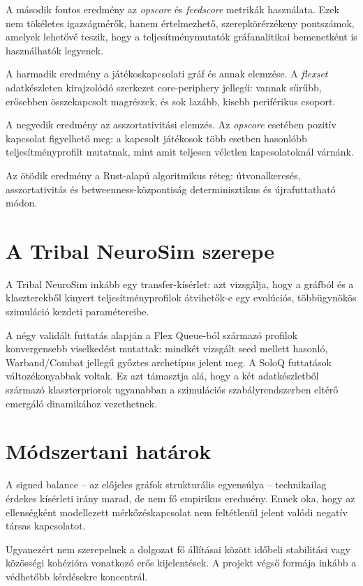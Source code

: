 A második fontos eredmény az \textit{opscore} és \textit{feedscore} metrikák használata. Ezek nem tökéletes igazságmérők, hanem értelmezhető, szerepkörérzékeny pontszámok, amelyek lehetővé teszik, hogy a teljesítménymutatók gráfanalitikai bemenetként is használhatók legyenek.

A harmadik eredmény a játékoskapcsolati gráf és annak elemzése. A \textit{flexset} adatkészleten kirajzolódó szerkezet core-periphery jellegű: vannak sűrűbb, erősebben összekapcsolt magrészek, és sok lazább, kisebb periférikus csoport.

A negyedik eredmény az asszortativitási elemzés. Az \textit{opscore} esetében pozitív kapcsolat figyelhető meg: a kapcsolt játékosok több esetben hasonlóbb teljesítményprofilt mutatnak, mint amit teljesen véletlen kapcsolatoknál várnánk.

Az ötödik eredmény a Rust-alapú algoritmikus réteg: útvonalkeresés, asszortativitás és betweenness-központiság determinisztikus és újrafuttatható módon.

\section{A Tribal NeuroSim szerepe}

A Tribal NeuroSim inkább egy transfer-kísérlet: azt vizsgálja, hogy a gráfból és a klaszterekből kinyert teljesítményprofilok átvihetők-e egy evolúciós, többügynökös szimuláció kezdeti paramétereibe.

A négy validált futtatás alapján a Flex Queue-ból származó profilok konvergensebb viselkedést mutattak: mindkét vizsgált seed mellett hasonló, Warband/Combat jellegű győztes archetípus jelent meg. A SoloQ futtatások változékonyabbak voltak. Ez azt támasztja alá, hogy a két adatkészletből származó klaszterpriorok ugyanabban a szimulációs szabályrendszerben eltérő emergáló dinamikához vezethetnek.

\section{Módszertani határok}

A signed balance -- az előjeles gráfok strukturális egyensúlya -- technikailag érdekes kísérleti irány marad, de nem fő empirikus eredmény. Ennek oka, hogy az ellenségként modellezett mérkőzéskapcsolat nem feltétlenül jelent valódi negatív társas kapcsolatot.

Ugyanezért nem szerepelnek a dolgozat fő állításai között időbeli stabilitási vagy közösségi kohézióra vonatkozó erős kijelentések. A projekt végső formája inkább a védhetőbb kérdésekre koncentrál.

